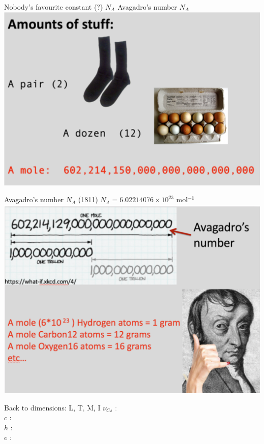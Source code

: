  \begin{frame}{Nobody's favourite constant (?) $N_A$}
 Avagadro's number $N_A$\\[1ex]
 \includegraphics[scale=0.4]{avagad1}
 \end{frame}
 
  \begin{frame}{ Avagadro's number $N_A$ (1811)}
 $N_A = 6.02214076\times10^{23}$ mol$^{-1}$\\[1ex]
 \includegraphics[scale=0.4]{avagad2}
 \end{frame}
 
 
 
\begin{frame}{Back to dimensions: L, T, M, I}
$\nu_{Cs}$ : \\[4ex]
 $c$ :\\[4ex]
 $h$ : \\[4ex] 
 $e$ : \\[4ex] 
 
\end{frame}

